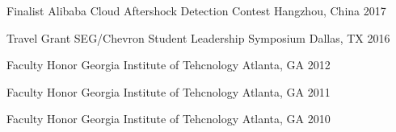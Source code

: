 \begin{cvhonors}

  \cvhonor
    {Finalist} %
    {Alibaba Cloud Aftershock Detection Contest} %
    {Hangzhou, China} %
    {2017} %

  \cvhonor
    {Travel Grant} %
    {SEG/Chevron Student Leadership Symposium} %
    {Dallas, TX} %
    {2016} %

  \cvhonor
    {Faculty Honor} %
    {Georgia Institute of Tehcnology} %
    {Atlanta, GA} %
    {2012} %

  \cvhonor
    {Faculty Honor} %
    {Georgia Institute of Tehcnology} %
    {Atlanta, GA} %
    {2011} %
    
  \cvhonor
    {Faculty Honor} %
    {Georgia Institute of Tehcnology} %
    {Atlanta, GA} %
    {2010} %


\end{cvhonors}
